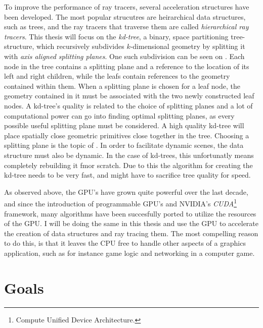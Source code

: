 To improve the performance of ray tracers, several acceleration
structures have been developed. The most popular strucutres are
heirarchical data structures, such as trees, and the ray tracers that
traverse them are called \textit{hierarchical ray tracers}. This
thesis will focus on the \textit{kd-tree}, a binary, space
partitioning tree-structure, which recursively subdivides
$k$-dimensional geometry by splitting it with \textit{axis aligned
  splitting planes}. One such subdivision can be seen on
. Each node in the tree contains a splitting
plane and a reference to the location of its left and right children,
while the leafs contain references to the geometry contained within
them. When a splitting plane is chosen for a leaf node, the geometry
contained in it must be associated with the two newly constructed leaf
nodes. A kd-tree's quality is related to the choice of splitting
planes and a lot of computational power can go into finding optimal
splitting planes, as every possible useful splitting plane must be
considered. A high quality kd-tree will place spatially close
geometric primitives close together in the tree. Choosing a splitting
plane is the topic of . In order to
facilitate dynamic scenes, the data structure must also be dynamic. In
the case of kd-trees, this unfortunatly means completely rebuilding it
fmor scratch. Due to this the algorithm for creating the kd-tree needs
to be very fast, and might have to sacrifice tree quality for speed.



As observed above, the GPU's have grown quite powerful over the last
decade, and since the introduction of programmable GPU's and
NVIDIA's \textit{CUDA}\footnote{Compute Unified Device Architecture.}
framework, many algorithms have been succesfully ported to utilize the
resources of the GPU. I will be doing the same in this thesis and use
the GPU to accelerate the creation of data structures and ray tracing
them. The most compelling reason to do this, is that it leaves the CPU
free to handle other aspects of a graphics application, such as for
instance game logic and networking in a computer game.



\section{Goals}

